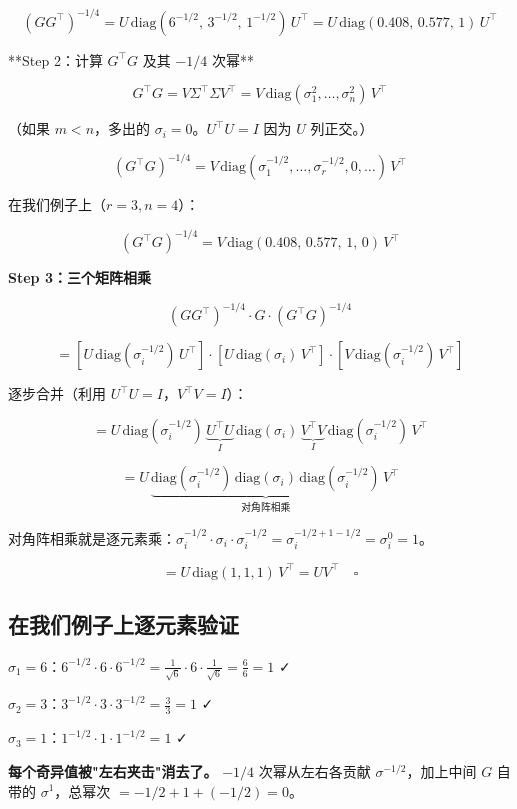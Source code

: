\documentclass[12pt,a4paper]{article}
\begin{document}
\[(GG^\top)^{-1/4} = U\,\text{diag}(6^{-1/2},\, 3^{-1/2},\, 1^{-1/2})\,U^\top = U\,\text{diag}(0.408,\, 0.577,\, 1)\,U^\top\]

**Step 2：计算 $G^\top G$ 及其 $-1/4$ 次幂**


\[G^\top G = V\Sigma^\top\Sigma V^\top = V\,\text{diag}(\sigma_1^2, \ldots, \sigma_n^2)\,V^\top\]

（如果 $m < n$，多出的 $\sigma_i = 0$。$U^\top U = I$ 因为 $U$ 列正交。）


\[(G^\top G)^{-1/4} = V\,\text{diag}(\sigma_1^{-1/2}, \ldots, \sigma_r^{-1/2}, 0, \ldots)\,V^\top\]

在我们例子上（$r = 3, n = 4$）：


\[(G^\top G)^{-1/4} = V\,\text{diag}(0.408,\, 0.577,\, 1,\, 0)\,V^\top\]

\textbf{Step 3：三个矩阵相乘}


\[(GG^\top)^{-1/4} \cdot G \cdot (G^\top G)^{-1/4}\]


\[= \left[U\,\text{diag}(\sigma_i^{-1/2})\,U^\top\right] \cdot \left[U\,\text{diag}(\sigma_i)\,V^\top\right] \cdot \left[V\,\text{diag}(\sigma_i^{-1/2})\,V^\top\right]\]

逐步合并（利用 $U^\top U = I$，$V^\top V = I$）：


\[= U\,\text{diag}(\sigma_i^{-1/2})\,\underbrace{U^\top U}_{I}\,\text{diag}(\sigma_i)\,\underbrace{V^\top V}_{I}\,\text{diag}(\sigma_i^{-1/2})\,V^\top\]


\[= U\,\underbrace{\text{diag}(\sigma_i^{-1/2})\,\text{diag}(\sigma_i)\,\text{diag}(\sigma_i^{-1/2})}_{\text{对角阵相乘}}\,V^\top\]

对角阵相乘就是逐元素乘：$\sigma_i^{-1/2} \cdot \sigma_i \cdot \sigma_i^{-1/2} = \sigma_i^{-1/2+1-1/2} = \sigma_i^0 = 1$。


\[= U\,\text{diag}(1, 1, 1)\,V^\top = UV^\top \quad \square\]


\subsection{在我们例子上逐元素验证}

$\sigma_1 = 6$：$6^{-1/2} \cdot 6 \cdot 6^{-1/2} = \frac{1}{\sqrt{6}} \cdot 6 \cdot \frac{1}{\sqrt{6}} = \frac{6}{6} = 1$ ✓

$\sigma_2 = 3$：$3^{-1/2} \cdot 3 \cdot 3^{-1/2} = \frac{3}{3} = 1$ ✓

$\sigma_3 = 1$：$1^{-1/2} \cdot 1 \cdot 1^{-1/2} = 1$ ✓

\textbf{每个奇异值被"左右夹击"消去了。} $-1/4$ 次幂从左右各贡献 $\sigma^{-1/2}$，加上中间 $G$ 自带的 $\sigma^1$，总幂次 $= -1/2 + 1 + (-1/2) = 0$。
\end{document}
